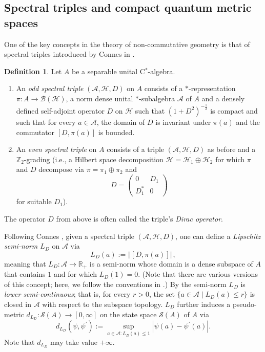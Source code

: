 \documentclass[a4paper,11pt,reqno]{amsart}
\numberwithin{equation}{section}
\numberwithin{equation}{section}
\theoremstyle{definition}
\newtheorem{definition}[theorem]{Definition}
\theoremstyle{remark}
\theoremstyle{remark}
\begin{document}
\vspace{3mm}


\subsection{Spectral triples and compact quantum metric spaces}

One of the key concepts in the theory of non-commutative geometry
is that of spectral triples introduced by Connes in \cite{Connes89}. \\

\begin{definition} Let $A$ be a separable unital C$^{\ast}$-algebra. 
\begin{enumerate}
\item An \emph{odd spectral triple} $(\mathcal{A},\mathcal{H},D)$ on $A$
consists of a $\ast$-representation $\pi:A\rightarrow\mathcal{B}(\mathcal{H})$,
a norm dense unital $\ast$-subalgebra $\mathcal{A}$ of $A$ and a densely
defined self-adjoint operator $D$ on $\mathcal{H}$ such that $(1+D^{2})^{-\frac{1}{2}}$
is compact and such that for every $a\in\mathcal{A}$, the domain
of $D$ is invariant under $\pi(a)$ and the commutator $[D,\pi(a)]$
is bounded. 
\item An \emph{even spectral triple} on $A$ consists of a triple $(\mathcal{A},\mathcal{H},D)$
as before and a $\mathbb{Z}_{2}$-grading (i.e., a Hilbert space decomposition
$\mathcal{H}=\mathcal{H}_{1}\oplus\mathcal{H}_{2}$ for which $\pi$
and $D$ decompose via $\pi=\pi_{1}\oplus\pi_{2}$ and 
\[
D=\left(\begin{array}{cc}
0 & D_{1}\\
D_{1}^{\ast} & 0
\end{array}\right)
\]
for suitable $D_1$).
\end{enumerate}
The operator $D$ from above is often called the triple's \emph{Dirac
operator}. \end{definition}

Following Connes \cite{Connes89}, given a spectral triple $(\mathcal{A},\mathcal{H},D)$,
one can define a \emph{Lipschitz semi-norm $L_{D}$ } on $\mathcal{A}$
via 
\[
L_{D}(a):=\left\Vert [D,\pi(a)]\right\Vert ,
\]
meaning that $L_{D}:\mathcal{A}\rightarrow\mathbb{R}_{+}$ is a semi-norm
whose domain is a dense subspace of $A$ that contains $1$ and for
which $L_{D}(1)=0$. (Note that there are various versions
of this concept; here, we follow the conventions in \cite{HSWZ13}.)
By \cite[Proposition 3.7]{Rieffel99} the semi-norm $L_{D}$ is \emph{lower semi-continuous}; that is, for
every $r>0$, the set $\{a\in\mathcal{A}\mid L_{D}(a)\leq r\}$ is
closed in $\mathcal{A}$ with respect to the subspace topology. $L_{D}$
further induces a pseudo-metric $d_{L_{D}}:\mathcal{S}(A)\rightarrow[0,\infty]$
on the state space $\mathcal{S}(A)$ of $A$ via 
\[
d_{L_{D}}(\psi,\psi^{\prime}):=\sup_{a\in \mathcal{A}:L_D(a)\leq1}|\psi(a)-\psi^{\prime}(a)|.
\]
Note that $d_{L_D}$ may take value $+ \infty$.
\end{document}
